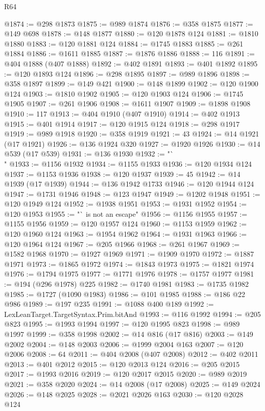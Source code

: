 \begin{lexlean}{R64}
\begin{coremodule}
@1874 := @298 @1873
@1875 := @989 @1874
@1876 := @358 @1875
@1877 := @149 @698
@1878 := @148 @1877
@1880 := @120 @1878 @124
@1881 := @1810 @1880
@1883 := @120 @1881 @124
@1884 := @1745 @1883
@1885 := @261 @1884
@1886 := @1611 @1885
@1887 := @1876 @1886
@1888 := 116
@1891 := @404 @1888 (@407 @1888)
@1892 := @402 @1891
@1893 := @401 @1892
@1895 := @120 @1893 @124
@1896 := @298 @1895
@1897 := @989 @1896
@1898 := @358 @1897
@1899 := @149 @421
@1900 := @148 @1899
@1902 := @120 @1900 @124
@1903 := @1810 @1902
@1905 := @120 @1903 @124
@1906 := @1745 @1905
@1907 := @261 @1906
@1908 := @1611 @1907
@1909 := @1898 @1908
@1910 := 117
@1913 := @404 @1910 (@407 @1910)
@1914 := @402 @1913
@1915 := @401 @1914
@1917 := @120 @1915 @124
@1918 := @298 @1917
@1919 := @989 @1918
@1920 := @358 @1919
@1921 := 43
@1924 := @14 @1921 (@17 @1921)
@1926 := @136 @1924 @320
@1927 := @1920 @1926
@1930 := @14 @539 (@17 @539)
@1931 := @136 @1930
@1932 := "`\\"
@1933 := @1156 @1932
@1934 := @1155 @1933
@1936 := @120 @1934 @124
@1937 := @1153 @1936
@1938 := @120 @1937
@1939 := 45
@1942 := @14 @1939 (@17 @1939)
@1944 := @136 @1942 @1733
@1946 := @120 @1944 @124
@1947 := @1731 @1946
@1948 := @123 @1947
@1949 := @1202 @1948
@1951 := @120 @1949 @124
@1952 := @1938 @1951
@1953 := @1931 @1952
@1954 := @120 @1953
@1955 := "` is not an escape"
@1956 := @1156 @1955
@1957 := @1155 @1956
@1959 := @120 @1957 @124
@1960 := @1153 @1959
@1962 := @120 @1960 @124
@1963 := @1954 @1962
@1964 := @1931 @1963
@1966 := @120 @1964 @124
@1967 := @205 @1966
@1968 := @261 @1967
@1969 := @1582 @1968
@1970 := @1927 @1969
@1971 := @1909 @1970
@1972 := @1887 @1971
@1973 := @1865 @1972
@1974 := @1843 @1973
@1975 := @1821 @1974
@1976 := @1794 @1975
@1977 := @1771 @1976
@1978 := @1757 @1977
@1981 := @194 (@296 @1978) @225
@1982 := @1740 @1981
@1983 := @1735 @1982
@1985 := @1727 (@1090 @1983)
@1986 := @101 @1985
@1988 := @186 @22 @986
@1989 := @197 @235
@1991 := @1088 @400 @189
@1992 := LexLeanTarget.TargetSyntax.Prim.bitAnd
@1993 := @116 @1992
@1994 := @205 @823
@1995 := @1993 @1994
@1997 := @120 @1995 @823
@1998 := @989 @1997
@1999 := @358 @1998
@2002 := @14 @816 (@17 @816)
@2003 := @149 @2002
@2004 := @148 @2003
@2006 := @1999 @2004 @163
@2007 := @120 @2006
@2008 := 64
@2011 := @404 @2008 (@407 @2008)
@2012 := @402 @2011
@2013 := @401 @2012
@2015 := @120 @2013 @124
@2016 := @205 @2015
@2017 := @1993 @2016
@2019 := @120 @2017 @2015
@2020 := @989 @2019
@2021 := @358 @2020
@2024 := @14 @2008 (@17 @2008)
@2025 := @149 @2024
@2026 := @148 @2025
@2028 := @2021 @2026 @163
@2030 := @120 @2028 @124

\end{coremodule}
\end{lexlean}
